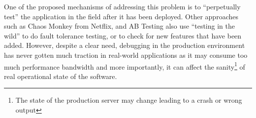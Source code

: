 One of the proposed mechanisms of addressing this problem is to ``perpetually test''\cite{perpetual} the application in the field after it has been deployed. 
Other approaches such as Chaos Monkey\cite{chaosmonkey} from Netflix, and AB Testing\cite{abtesting} also use ``testing in the wild'' to do fault tolerance testing, or to check for new features that have been added.  
However, despite a clear need, debugging in the production environment has never gotten much traction in real-world applications as it may consume too much performance bandwidth and more importantly, it can affect the sanity\footnote{The state of the production server may change leading to a crash or wrong output} of real operational state of the software.



